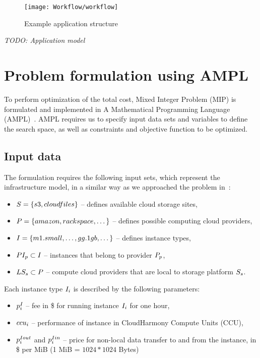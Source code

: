 {    \begin{figure}[tb]
        \centering \texttt{[image: Workflow/workflow]}
        \caption{Example application structure}
        \label{fig:workflow:appmodel}
    \end{figure}
    

    
    \emph{TODO: Application model}
    
    \section{Problem formulation using AMPL}
    \label{sec:workflow:problem}
  
    To perform optimization of the total cost, Mixed Integer Problem (MIP)
    is formulated and implemented in A Mathematical Programming
    Language (AMPL)~\cite{Fourer2002}.  AMPL requires us to specify input data sets
    and variables to define the search space, as well as constraints and
    objective function to be optimized.
    
    \subsection{Input data}
    \label{sec:workflow:problem:input}
     
    The formulation requires the following input sets, which represent the
    infrastructure model, in a similar way as we approached the problem in~\cite{Malawski-FGCS-13}:
    \begin{itemize}
        \item $S = \{s3, cloudfiles\}$ -- defines available cloud storage
        sites,
        \item $P = \{amazon, rackspace, \dotsc\}$ -- defines
        possible computing cloud providers,
        \item $I = \{m1.small, \dots, gg.1gb, \dotsc\}$ -- defines
        instance types,
        \item $PI_{p} \subset I$ -- instances that
        belong to provider $P_p$,
        \item $LS_{s} \subset P$ -- compute cloud providers
        that are local to storage platform $S_s$.
    \end{itemize}        
        
    Each instance type $I_i$ is described by the following parameters:
    \begin{itemize}
        \item $p^I_i$ -- fee in \$ for running instance $I_i$
        for one hour,
        \item $ccu_i$ -- performance of instance in CloudHarmony Compute Units
        (CCU),
        \item $p^{Iout}_i$ and $p^{Iin}_i$ --
        price for non-local data transfer to and from the instance, in \$ per
        MiB (1 MiB = $1024*1024$ Bytes)
    \end{itemize}
    
}
